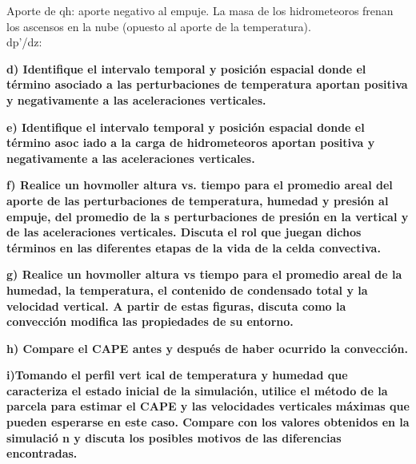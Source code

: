 \documentclass[a4paper, 11 pt]{article}
\begin{document}
Aporte de qh: aporte negativo al empuje. La masa de los hidrometeoros frenan los ascensos en la nube (opuesto al aporte de la temperatura). \\

dp'/dz: 



\textbf{d) Identifique  el  intervalo  temporal  y  posición  espacial  donde  el  término 
asociado    a    las    perturbaciones    de    temperatura    aportan    positiva    y 
negativamente a las aceleraciones verticales.
}


\textbf{e) Identifique  el  intervalo  temporal  y  posición  espacial  donde  el  término 
asoc
iado a la carga de hidrometeoros aportan positiva y negativamente a las 
aceleraciones verticales.
}


\textbf{f) Realice un hovmoller altura vs. tiempo para el promedio areal del aporte de 
las  perturbaciones  de  temperatura,  humedad  y  presión  al  empuje,  del 
promedio   de   la
s   perturbaciones   de   presión   en   la   vertical   y   de   las 
aceleraciones  verticales.  Discuta  el  rol  que  juegan  dichos  términos  en  las 
diferentes etapas de la vida de la celda convectiva.
}


\textbf{g) Realice   un   hovmoller   altura   vs   tiempo   para   el   promedio   areal   de   la  
humedad, 
la  temperatura,  el  contenido  de  condensado  total  y  la  velocidad 
vertical.  A  partir  de  estas  figuras,  discuta  como  la  convección  modifica  las 
propiedades de su entorno. 
}


\textbf{h) Compare el CAPE antes y después de haber ocurrido la convección.
}


\textbf{i)Tomando  el  perfil  vert
ical  de  temperatura  y  humedad  que  caracteriza  el 
estado inicial de la simulación, utilice el método de la parcela para estimar el 
CAPE  y  las  velocidades  verticales  máximas  que  pueden  esperarse  en  este 
caso.  Compare  con  los  valores  obtenidos  en  la  simulació
n  y  discuta  los 
posibles motivos de las diferencias encontradas.
}
\end{document}
